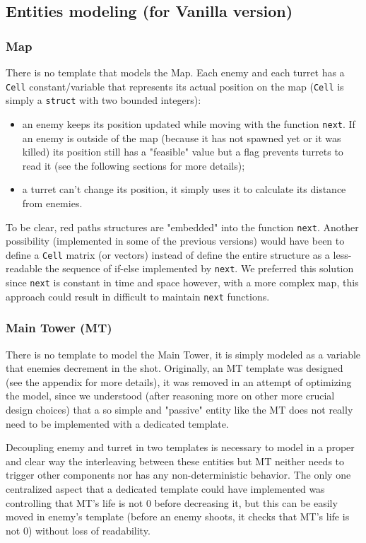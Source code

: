 \documentclass[
10pt, %
a4paper, %
oneside, %
headinclude,footinclude, %
BCOR5mm, %
]{scrartcl}
\begin{document}
		\subsection{Entities modeling (for Vanilla version)}
			\subsubsection{Map}
				There is no template that models the Map. Each enemy and each turret has a \texttt{Cell} constant/variable that represents its actual position on the map (\texttt{Cell} is simply a \texttt{struct} with two bounded integers):
				\begin{itemize}
					\item an enemy keeps its position updated while moving with the function \texttt{next}. If an enemy is outside of the map (because it has not spawned yet or it was killed) its position still has a "feasible" value but a flag prevents turrets to read it (see the following sections for more details);
					\item a turret can't change its position, it simply uses it to calculate its distance from enemies.  
				\end{itemize}
				To be clear, red paths structures are "embedded" into the function \texttt{next}. Another possibility (implemented in some of the previous versions) would have been to define a \texttt{Cell} matrix (or vectors) instead of define the entire structure as a less-readable the sequence of if-else implemented by \texttt{next}. We preferred this solution since \texttt{next} is constant in time and space however, with a more complex map, this approach could result in difficult to maintain \texttt{next} functions.
			\subsubsection{Main Tower (MT)}
				There is no template to model the Main Tower, it is simply modeled as a variable that enemies decrement in the shot. Originally, an MT template was designed (see the appendix for more details), it was removed in an attempt of optimizing the model, since we understood (after reasoning more on other more crucial design choices) that a so simple and "passive" entity like the MT does not really need to be implemented with a dedicated template.
				
				Decoupling enemy and turret in two templates is necessary to model in a proper and clear way the interleaving between these entities but MT neither needs to trigger other components nor has any non-deterministic behavior. The only one centralized aspect that a dedicated template could have implemented was controlling that MT's life is not $0$ before decreasing it, but this can be easily moved in enemy's template (before an enemy shoots, it checks that MT's life is not $0$) without loss of readability.
\end{document}
